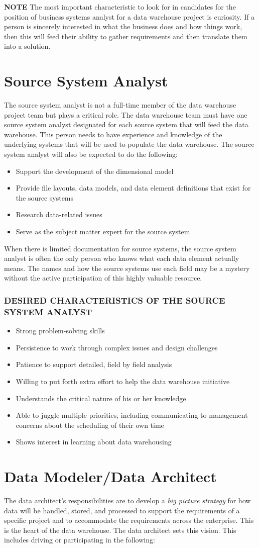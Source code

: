 \documentclass{vldb}
\newcommand{\bi}{\begin{itemize}}
\newcommand{\ei}{\end{itemize}}
\newcommand{\ii}{\item}
\begin{document}
\noindent
\textbf{NOTE} The most important characteristic to look for in candidates for the position of business systems analyst for a data warehouse project is curiosity. If a person is sincerely interested in what the business does and how things work, then this will feed their ability to gather requirements and then translate them into a solution.

\section{Source System Analyst}
The source system analyst is not a full-time member of the data warehouse project team but plays a critical role. The data warehouse team must have one source system analyst designated for each source system that will feed the data warehouse. This person needs to have experience and knowledge of the underlying systems that will be used to populate the data warehouse. The source system analyst will also be expected to do the following:

\bi
\ii Support the development of the dimensional model
\ii Provide file layouts, data models, and data element definitions that exist for the source systems
\ii Research data-related issues
\ii Serve as the subject matter expert for the source system
\ei
When there is limited documentation for source systems, the source system analyst is often the only person who knows what each data element actually means. The names and how the source systems use each field may be a mystery without the active participation of this highly valuable resource.

\subsubsection*{DESIRED CHARACTERISTICS OF THE SOURCE SYSTEM ANALYST}
\bi
\ii Strong problem-solving skills
\ii Persistence to work through complex issues and design challenges
\ii Patience to support detailed, field by field analysis
\ii Willing to put forth extra effort to help the data warehouse initiative
\ii Understands the critical nature of his or her knowledge
\ii Able to juggle multiple priorities, including communicating to management concerns about the scheduling of their own time
\ii Shows interest in learning about data warehousing
\ei

\section{Data Modeler/Data Architect}
The data architect’s responsibilities are to develop a \textit{big picture strategy} for how data will be handled, stored, and processed to support the requirements of a specific project and to accommodate the requirements across the enterprise. 
This is the heart of the data warehouse. The data architect sets this vision. This includes driving or participating in the following:
\end{document}
